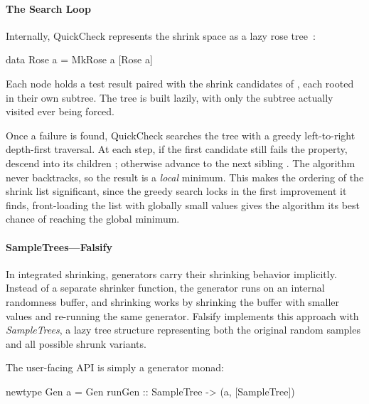 \paragraph{The Search Loop}

Internally, QuickCheck represents the shrink space as a lazy rose
tree~\cite{ClaessenH00}:

\begin{code}[language=Haskell]
	data Rose a = MkRose a [Rose a]
\end{code}

\noindent
Each  node holds a test result  paired with the shrink
candidates of , each rooted in their own subtree. The tree is built
lazily, with only the subtree actually visited ever being forced.

Once a failure is found, QuickCheck searches the tree with a greedy left-to-right
depth-first traversal. At each step, if the first candidate 
still fails the property, descend into its children ;
otherwise advance to the next sibling . The algorithm never
backtracks, so the result is a \emph{local} minimum. This makes the ordering of the
shrink list significant, since the greedy search locks in the first improvement it
finds, front-loading the list with globally small values gives the algorithm its best
chance of reaching the global minimum.

\paragraph*{SampleTrees---Falsify} \label{shrinkeval:subsec:sampletrees}

In integrated shrinking, generators carry their shrinking behavior implicitly. Instead
of a separate shrinker function, the generator runs on an internal randomness buffer,
and shrinking works by shrinking the buffer with smaller values and re-running the same
generator. Falsify implements this approach with \emph{SampleTrees}, a lazy tree
structure representing both the original random samples and all possible shrunk
variants.

The user-facing API is simply a generator monad:

\begin{code}[language=Haskell]
    newtype Gen a = Gen { runGen :: SampleTree -> (a, [SampleTree]) }
\end{code}

